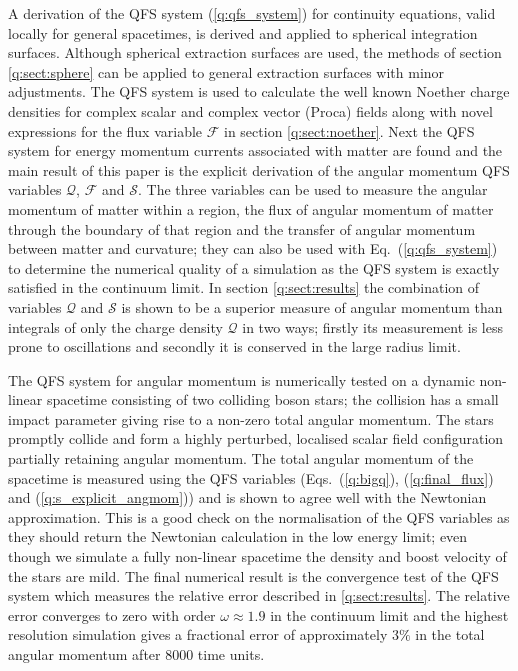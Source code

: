 A derivation of the QFS system (\ref{q:qfs_system}) for continuity equations, valid locally for general spacetimes, is derived and applied to spherical integration surfaces. Although spherical extraction surfaces are used, the methods of section \ref{q:sect:sphere} can be applied to general extraction surfaces with minor adjustments. The QFS system is used to calculate the well known Noether charge densities for complex scalar and complex vector (Proca) fields along with novel expressions for the flux variable $\mathcal{F}$ in section \ref{q:sect:noether}. Next the QFS system for energy momentum currents associated with matter are found and the main result of this paper is the explicit derivation of the angular momentum QFS variables $\mathcal{Q}$,  $\mathcal{F}$ and $\mathcal{S}$. The three variables can be used to measure the angular momentum of matter within a region, the flux of angular momentum of matter through the boundary of that region and the transfer of angular momentum between matter and curvature; they can also be used with Eq.~(\ref{q:qfs_system}) to determine the numerical quality of a simulation as the QFS system is exactly satisfied in the continuum limit. In section \ref{q:sect:results} the combination of variables $\mathcal{Q}$ and $\mathcal{S}$ is shown to be a superior measure of angular momentum than integrals of only the charge density $\mathcal{Q}$ in two ways; firstly its measurement is less prone to oscillations and secondly it is conserved in the large radius limit.

The QFS system for angular momentum is numerically tested on a dynamic non-linear spacetime consisting of two colliding boson stars; the collision has a small impact parameter giving rise to a non-zero total angular momentum. The stars promptly collide and form a highly perturbed, localised scalar field configuration partially retaining angular momentum. The total angular momentum of the spacetime is measured using the QFS variables (Eqs.~(\ref{q:bigq}), (\ref{q:final_flux}) and (\ref{q:s_explicit_angmom})) and is shown to agree well with the Newtonian approximation. This is a good check on the normalisation of the QFS variables as they should return the Newtonian calculation in the low energy limit; even though we simulate a fully non-linear spacetime the density and boost velocity of the stars are mild. The final numerical result is the convergence test of the QFS system which measures the relative error described in \ref{q:sect:results}. The relative error converges to zero with order $\omega\approx 1.9$ in the continuum limit and the highest resolution simulation gives a fractional error of approximately $3 \%$ in the total angular momentum after $8000$ time units. 

